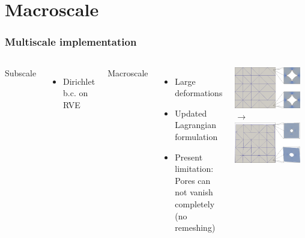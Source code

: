 \documentclass[11pt,mathserif]{beamer}
\begin{document}
\section{Macroscale}
\begin{frame}
 \frametitle{Multiscale implementation}
\begin{columns}
 Subscale
 \begin{itemize}
  \item Dirichlet b.c. on RVE
 \end{itemize}

 Macroscale
 \begin{itemize}
  \item Large deformations
   \item Updated Lagrangian formulation
  \item \alert{Present limitation:} Pores can not vanish completely (no remeshing)
 \end{itemize}


\begin{center}
 \includegraphics[width=0.9\textwidth]{figures/Sintering_5x5_000.png}\\
 $\longrightarrow$\\[0.5em]
 \includegraphics[width=0.9\textwidth]{figures/Sintering_5x5_114.png}
\end{center}
\end{columns}
\end{frame}
\end{document}
